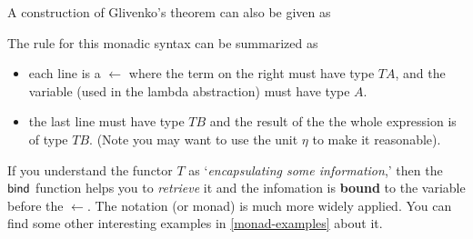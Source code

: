 A construction of Glivenko's theorem can also be given as

The rule for this monadic syntax can be summarized as
\begin{itemize}
    \item each line is a $\leftarrow$ where the term on the
    right must have type $TA$, and the variable (used in the lambda
    abstraction) must have type $A$. 
    \item the last line must have type $TB$ and the result of the 
    the whole expression is of type $TB$. (Note you may want to use
    the unit $\eta$ to make it reasonable).
\end{itemize}

If you understand the functor $T$ as `{\it encapsulating some 
information},' then the $\text{\sf bind}$ function helps you to {\it retrieve}
it and the infomation is {\bf bound} to the variable before the 
$\leftarrow$. The notation (or monad) is much more widely applied.
You can find some other interesting examples in \autoref{monad-examples} about it. 
